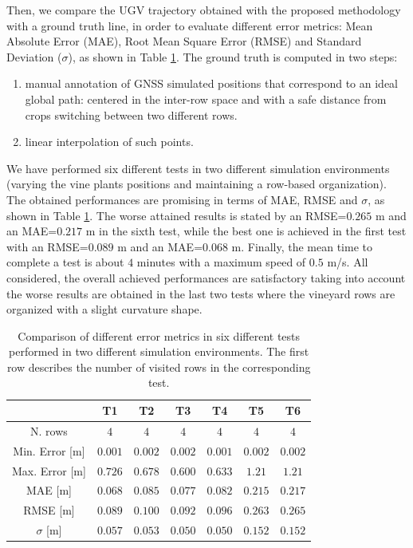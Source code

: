 \documentclass[journal]{IEEEtran}
\begin{document}
Then, we compare the UGV trajectory obtained with the proposed methodology with a ground truth line, in order to evaluate different error metrics: Mean Absolute Error (MAE), Root Mean Square Error (RMSE) and Standard Deviation ($\sigma$), as shown in Table \ref{sim_test}. The ground truth is computed in two steps:
\begin{enumerate}
    \item manual annotation of GNSS simulated positions that correspond to an ideal global path: centered in the inter-row space and with a safe distance from crops switching between two different rows.
    \item linear interpolation of such points.
\end{enumerate}
We have performed six different tests in two different simulation environments (varying the vine plants positions and maintaining a row-based organization). The obtained performances are promising in terms of MAE, RMSE and $\sigma$, as shown in Table \ref{sim_test}. The worse attained results is stated by an RMSE=$0.265$ m and an MAE=$0.217$ m in the sixth test, while the best one is achieved in the first test with an RMSE=$0.089$ m and an MAE=$0.068$ m. Finally, the mean time to complete a test is about $4$ minutes with a maximum speed of $0.5$ m/s. All considered, the overall achieved performances are satisfactory taking into account the worse results are obtained in the last two tests where the vineyard rows are organized with a slight curvature shape.

\begin{table}[h]
\caption{Comparison of different error metrics in six different tests performed in two different simulation environments. The first row describes the number of visited rows in the corresponding test.}
\centering
\begin{tabular}{ccccccc}

     & T1  & T2 & T3 & T4 & T5 & T6 \\
\hline
N. rows    & $4$ & $4$ & $4$ & $4$ & $4$ & $4$ \\

Min. Error [m] & $0.001$ & $0.002$ & $0.002$ & $0.001$ & $0.002$ & $0.002$\\

Max. Error [m] & $0.726$ & $0.678$ & $0.600$ & $0.633$ & $1.21$ & $1.21$\\

MAE [m]    & $0.068$ & $0.085$ & $0.077$ & $0.082$ & $0.215$ & $0.217$\\

RMSE [m] & $0.089$ & $0.100$ & $0.092$ & $0.096$ & $0.263$ & $0.265$\\

$\sigma$ [m]   & $0.057$ & $0.053$ & $0.050$ & $0.050$ & $0.152$ & $0.152$ \\
\hline
           
\end{tabular}
\label{sim_test}
\end{table}
\end{document}

